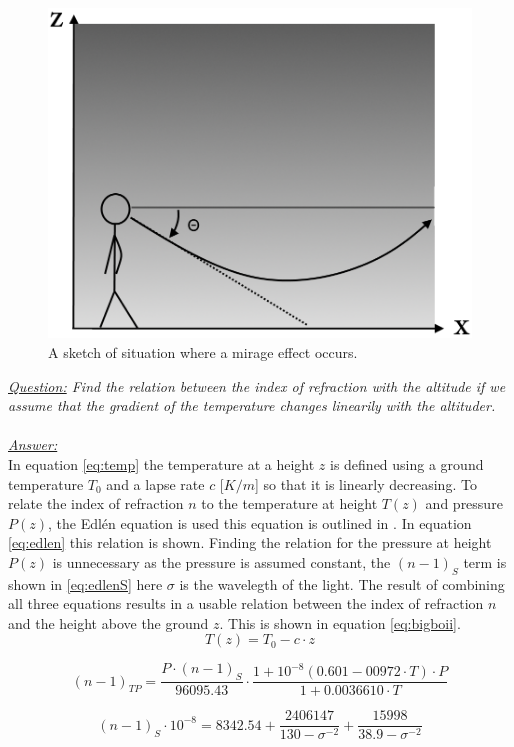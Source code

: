\documentclass{article}
\begin{document}
\begin{figure}[h!]
	\centering
	\includegraphics[width=0.4\linewidth,keepaspectratio]{afbeeldingen/miraaj.png}
	\caption{A sketch of situation where a mirage effect occurs.}
	\label{fig:mirage}
\end{figure}
\textit{\underline{Question:} Find the relation between the index of refraction with the altitude if we assume that the gradient of the temperature changes linearily with the altituder.}\\
\\
\textit{\underline{Answer:}} \\
In equation \ref{eq:temp} the temperature at a height $z$ is defined using a ground temperature $T_0$ and a lapse rate $c$ [$K /m$] so that it is linearly decreasing. To relate the index of refraction $n$ to the temperature at height $T(z)$ and pressure $P(z)$, the Edl\'en equation is used this equation is outlined in \cite{birch_downs}. In equation \ref{eq:edlen} this relation is shown. Finding the relation for the pressure at height $P(z)$ is unnecessary as the pressure is assumed constant, the $(n-1)_S$ term is shown in \ref{eq:edlenS} here $\sigma$ is the wavelegth of the light. The result of combining all three equations results in a usable relation between the index of refraction $n$ and the height above the ground $z$. This is shown in equation \ref{eq:bigboii}.\\

\begin{equation}
	T(z) = T_0 - c \cdot z
	\label{eq:temp}
\end{equation}

\begin{equation}
	(n-1)_{TP} = \frac{P\cdot(n-1)_S}{96095.43}\cdot \frac{1+10^{-8}(0.601-00972\cdot T)\cdot P}{1+0.0036610\cdot T}
	\label{eq:edlen}
\end{equation}

\begin{equation}
	(n-1)_S \cdot 10^{-8} = 8342.54 + \frac{2406147}{130-\sigma^{-2}}+\frac{15998}{38.9-\sigma^{-2}}
	\label{eq:edlenS}
\end{equation}
\end{document}

